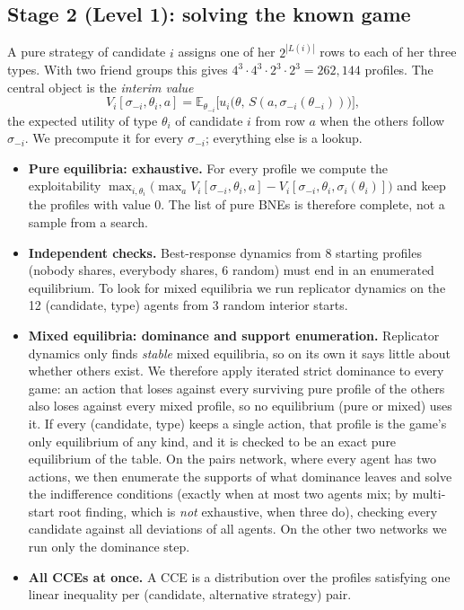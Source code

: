 \documentclass[10pt]{article}
\theoremstyle{plain}
\theoremstyle{definition}\newtheorem{definition}{Definition}
\newcommand{\E}{\mathbb{E}}\newcommand{\1}{\mathbf{1}}
\begin{document}
\subsection{Stage 2 (Level 1): solving the known game}
A pure strategy of candidate $i$ assigns one of her $2^{|L(i)|}$ rows to each of her three types. With two friend groups this gives
$4^3\cdot4^3\cdot2^3\cdot2^3=262{,}144$ profiles. The central object is the \emph{interim value}
\[
V_i[\sigma_{-i},\theta_i,a]=\E_{\theta_{-i}}\big[u_i\big(\theta,\,S(a,\sigma_{-i}(\theta_{-i}))\big)\big],
\]
the expected utility of type $\theta_i$ of candidate $i$ from row $a$ when the others follow $\sigma_{-i}$. We precompute it for every $\sigma_{-i}$; everything else is a lookup.
\begin{itemize}
\item \textbf{Pure equilibria: exhaustive.} For every profile we compute the exploitability $\max_{i,\theta_i}\big(\max_aV_i[\sigma_{-i},\theta_i,a]-V_i[\sigma_{-i},\theta_i,\sigma_i(\theta_i)]\big)$
and keep the profiles with value 0. The list of pure BNEs is therefore complete, not a sample from a search.
\item \textbf{Independent checks.} Best-response dynamics from 8 starting profiles (nobody shares, everybody shares, 6 random) must end in an enumerated equilibrium.
To look for mixed equilibria we run replicator dynamics on the 12 (candidate, type) agents from 3 random interior starts.
\item \textbf{Mixed equilibria: dominance and support enumeration.} Replicator dynamics only finds \emph{stable} mixed equilibria, so on its own it says little about whether others exist.
We therefore apply iterated strict dominance to every game: an action that loses against every surviving pure profile of the others also loses against every mixed profile, so no equilibrium
(pure or mixed) uses it. If every (candidate, type) keeps a single action, that profile is the game's only equilibrium of any kind, and it is checked to be an exact pure equilibrium of the table.
On the pairs network, where every agent has two actions, we then enumerate the supports of what dominance leaves and solve the indifference conditions (exactly when at most two agents mix; by multi-start root
finding, which is \emph{not} exhaustive, when three do), checking every candidate against all deviations of all agents. On the other two networks we run only the dominance step.
\item \textbf{All CCEs at once.} A CCE is a distribution over the profiles satisfying one linear inequality per (candidate, alternative strategy) pair.

\end{itemize}
\end{document}
